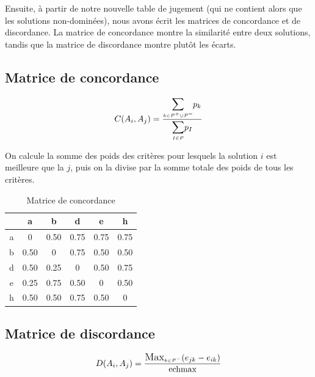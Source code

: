 \documentclass[paper=a4, fontsize=11pt]{report}
\numberwithin{equation}{section}		%
\numberwithin{figure}{section}			%
\numberwithin{table}{section}				%
\begin{document}
Ensuite, à partir de notre nouvelle table de jugement (qui ne contient alors que les solutions non-dominées), nous avons écrit les matrices de concordance et de discordance. La matrice de concordance montre la similarité entre deux solutions, tandis que la matrice de discordance montre plutôt les écarts.\\

\subsection{Matrice de concordance}

\begin{equation*}
C(A_i, A_j) = \frac{\mathlarger{\mathlarger{\sum}}\limits_{\mathsmaller{k \in P^+ \cup P^=}} p_k}{\mathlarger{\mathlarger{\sum}}\limits_{\mathsmaller{I \in P}} p_I}
\end{equation*} 

On calcule la somme des poids des critères pour lesquels la solution $i$ est meilleure que la $j$, puis on la divise par la somme totale des poids de tous les critères.\\

\begin{table}[H]
\begin{center}
\begin{tabular}{c|ccccc}
 & a & b & d & e & h \\ 
\hline 
a & 0 & 0.50 & 0.75 & 0.75 & 0.75 \\ 
b & 0.50 & 0 &	0.75 &	 0.50 & 0.50 \\ 
d & 0.50 & 0.25 & 0 & 0.50 & 0.75 \\ 
e & 0.25 & 0.75 & 0.50 & 0 & 0.50 \\ 
h & 0.50 & 0.50 & 0.75 & 0.50 & 0\\ 
\end{tabular} 
\caption{Matrice de concordance} 
\end{center}
\end{table}



\subsection{Matrice de discordance} 

\begin{equation*}
D(A_i, A_j) = \frac{\mathlarger{\mathlarger{\text{Max}}}_{\mathsmaller{k \in P^- }} (e_{jk} - e_{ik})}{\text{echmax}}
\end{equation*} 
\end{document}
